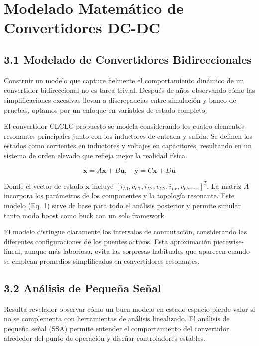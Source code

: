 \section{Modelado Matemático de Convertidores DC-DC}

\subsection{3.1 Modelado de Convertidores Bidireccionales}

Construir un modelo que capture fielmente el comportamiento dinámico de un convertidor bidireccional no es tarea trivial. Después de años observando cómo las simplificaciones excesivas llevan a discrepancias entre simulación y banco de pruebas, optamos por un enfoque en variables de estado completo.

El convertidor CLCLC propuesto se modela considerando los cuatro elementos resonantes principales junto con los inductores de entrada y salida. Se definen los estados como corrientes en inductores y voltajes en capacitores, resultando en un sistema de orden elevado que refleja mejor la realidad física.

\begin{equation}
\label{eq:state_space}
\dot{\mathbf{x}} = A\mathbf{x} + B\mathbf{u}, \quad \mathbf{y} = C\mathbf{x} + D\mathbf{u}
\end{equation}

Donde el vector de estado \(\mathbf{x}\) incluye \([i_{L1}, v_{C1}, i_{L2}, v_{C2}, i_{Lr}, v_{Cr}, \dots]^T\). La matriz \(A\) incorpora los parámetros de los componentes y la topología resonante. Este modelo (Eq. 1) sirve de base para todo el análisis posterior y permite simular tanto modo boost como buck con un solo framework.

El modelo distingue claramente los intervalos de conmutación, considerando las diferentes configuraciones de los puentes activos. Esta aproximación piecewise-lineal, aunque más laboriosa, evita las sorpresas habituales que aparecen cuando se emplean promedios simplificados en convertidores resonantes.

\subsection{3.2 Análisis de Pequeña Señal}

Resulta revelador observar cómo un buen modelo en estado-espacio pierde valor si no se complementa con herramientas de análisis linealizado. El análisis de pequeña señal (SSA) permite entender el comportamiento del convertidor alrededor del punto de operación y diseñar controladores estables.

